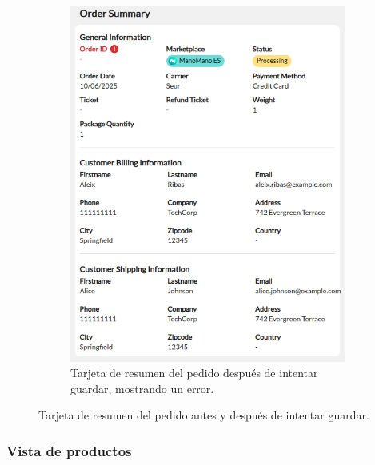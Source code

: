 \begin{figure}[H]
\begin{subfigure}{0.45\linewidth}
        \includegraphics[width=\linewidth]{figures/design_develop/screenshots/tarjeta_resumen_despues_guardar.png}
        \caption{Tarjeta de resumen del pedido después de intentar guardar, mostrando un error.}
    \end{subfigure}
    \caption{Tarjeta de resumen del pedido antes y después de intentar guardar.}
    \label{fig:dev:ss:tarjeta_resumen_pedido}
\end{figure}

\subsubsection{Vista de productos}
\label{dev:subsubsec:vista_productos}

